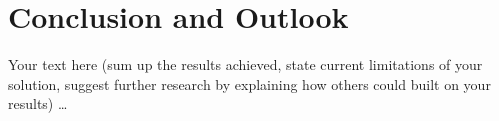 \chapter{Conclusion and Outlook}\label{chap:conclusion}
\chapterstart

Your text here (sum up the results achieved, state current limitations of your solution, suggest further research by explaining how others could built on your results) \ldots

\chapterend

